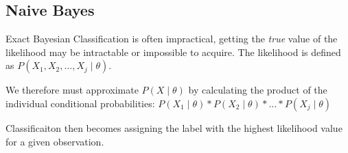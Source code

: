 \documentclass[letterpaper,12pt]{article}
\begin{document}
\subsection{Naive Bayes}

Exact Bayesian Classification is often impractical, getting the \emph{true}
value of the likelihood may be intractable or impossible to acquire. The
likelihood is defined as $P(X_1,X_2,\dots,X_j \mid \theta)$.

We therefore must approximate $P(X \mid \theta)$ by calculating the product of the
individual conditional probabilities: $P(X_1 \mid \theta)*P(X_2 \mid
\theta)*\dots*P(X_j \mid \theta)$

Classificaiton then becomes assigning the label with the highest likelihood
value for a given observation.
\end{document}
